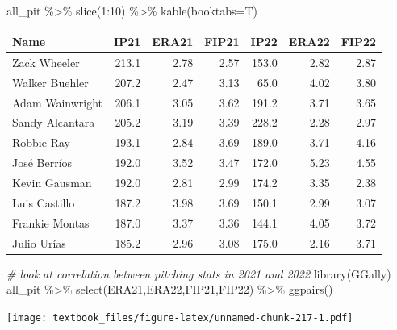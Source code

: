 \documentclass[
  11pt,
]{book}
\newenvironment{Shaded}{\begin{snugshade}}{\end{snugshade}}
\newcommand{\AttributeTok}[1]{\textcolor[rgb]{0.77,0.63,0.00}{#1}}
\newcommand{\CommentTok}[1]{\textcolor[rgb]{0.56,0.35,0.01}{\textit{#1}}}
\newcommand{\DecValTok}[1]{\textcolor[rgb]{0.00,0.00,0.81}{#1}}
\newcommand{\FunctionTok}[1]{\textcolor[rgb]{0.00,0.00,0.00}{#1}}
\newcommand{\NormalTok}[1]{#1}
\newcommand{\SpecialCharTok}[1]{\textcolor[rgb]{0.00,0.00,0.00}{#1}}
\theoremstyle{definition}
\theoremstyle{definition}
\theoremstyle{definition}
\theoremstyle{definition}
\theoremstyle{remark}
\begin{document}
\begin{Shaded}
\begin{Highlighting}[]
\NormalTok{all\_pit }\SpecialCharTok{\%\textgreater{}\%} \FunctionTok{slice}\NormalTok{(}\DecValTok{1}\SpecialCharTok{:}\DecValTok{10}\NormalTok{) }\SpecialCharTok{\%\textgreater{}\%} \FunctionTok{kable}\NormalTok{(}\AttributeTok{booktabs=}\NormalTok{T)}
\end{Highlighting}
\end{Shaded}

\begin{tabular}{lrrrrrr}
\toprule
Name & IP21 & ERA21 & FIP21 & IP22 & ERA22 & FIP22\\
\midrule
Zack Wheeler & 213.1 & 2.78 & 2.57 & 153.0 & 2.82 & 2.87\\
Walker Buehler & 207.2 & 2.47 & 3.13 & 65.0 & 4.02 & 3.80\\
Adam Wainwright & 206.1 & 3.05 & 3.62 & 191.2 & 3.71 & 3.65\\
Sandy Alcantara & 205.2 & 3.19 & 3.39 & 228.2 & 2.28 & 2.97\\
Robbie Ray & 193.1 & 2.84 & 3.69 & 189.0 & 3.71 & 4.16\\
\addlinespace
José Berríos & 192.0 & 3.52 & 3.47 & 172.0 & 5.23 & 4.55\\
Kevin Gausman & 192.0 & 2.81 & 2.99 & 174.2 & 3.35 & 2.38\\
Luis Castillo & 187.2 & 3.98 & 3.69 & 150.1 & 2.99 & 3.07\\
Frankie Montas & 187.0 & 3.37 & 3.36 & 144.1 & 4.05 & 3.72\\
Julio Urías & 185.2 & 2.96 & 3.08 & 175.0 & 2.16 & 3.71\\
\bottomrule
\end{tabular}

\newpage

\begin{Shaded}
\begin{Highlighting}[]
\CommentTok{\# look at correlation between pitching stats in 2021 and 2022}
\FunctionTok{library}\NormalTok{(GGally)}
\NormalTok{all\_pit }\SpecialCharTok{\%\textgreater{}\%} \FunctionTok{select}\NormalTok{(ERA21,ERA22,FIP21,FIP22) }\SpecialCharTok{\%\textgreater{}\%} \FunctionTok{ggpairs}\NormalTok{()}
\end{Highlighting}
\end{Shaded}

\texttt{[image: textbook\_files/figure-latex/unnamed-chunk-217-1.pdf]}

\newpage
\end{document}
